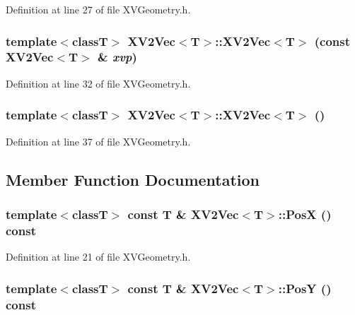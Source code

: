 Definition at line 27 of file XVGeometry.h.\label{XV2Vec_a5}
\hypertarget{class_XV2Vec_a5}{
\subsubsection[XV2Vec]{\setlength{\rightskip}{0pt plus 5cm}template$<$classT$>$ XV2Vec$<$T$>$::XV2Vec$<$T$>$ (const XV2Vec$<$T$>$ \& {\em xvp})}}




Definition at line 32 of file XVGeometry.h.\label{XV2Vec_a6}
\hypertarget{class_XV2Vec_a6}{
\subsubsection[XV2Vec]{\setlength{\rightskip}{0pt plus 5cm}template$<$classT$>$ XV2Vec$<$T$>$::XV2Vec$<$T$>$ ()}}




Definition at line 37 of file XVGeometry.h.

\subsection{Member Function Documentation}
\label{XV2Vec_a0}
\hypertarget{class_XV2Vec_a0}{
\subsubsection[PosX]{\setlength{\rightskip}{0pt plus 5cm}template$<$classT$>$ const T \& XV2Vec$<$T$>$::Pos\-X () const}}




Definition at line 21 of file XVGeometry.h.\label{XV2Vec_a1}
\hypertarget{class_XV2Vec_a1}{
\subsubsection[PosY]{\setlength{\rightskip}{0pt plus 5cm}template$<$classT$>$ const T \& XV2Vec$<$T$>$::Pos\-Y () const}}




